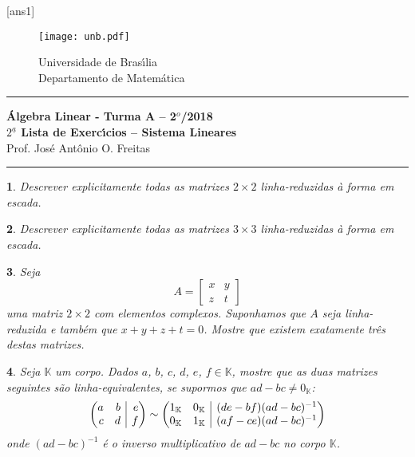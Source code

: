 \documentclass[12pt]{exam}
\makeatletter
\newenvironment{amatrix}[1]{%
  \left(\begin{array}{@{}*{#1}{r}|r@{}}
}{%
  \end{array}\right)
}
\newtheorem{exercicio}{}
\newcommand{\cp}[1]{\mathbb{#1}}
\newcommand{\vesp}[1]{\vspace{ #1  cm}}
\makeatother
\begin{document}
\pagestyle{empty}

[ans1]

\begin{figure}[h]
        \begin{minipage}[c]{1.7cm}
        \texttt{[image: unb.pdf]}
        \end{minipage}%
        \hspace{0pt}
        \begin{minipage}[c]{4in}
          {Universidade de Bras{\'\i}lia} \\
          {Departamento de Matem{\'a}tica}
\end{minipage}
\end{figure}

\vesp{-0.35} \hrule

\begin{center}
{\Large\bf \'Algebra Linear - Turma A -- 2$^{o}$/2018} \\ \vspace{9pt} {\large\bf
  $2^{\underline{a}}$ Lista de Exerc{\'\i}cios -- Sistema Lineares}\\ \vspace{9pt} Prof. Jos{\'e} Ant{\^o}nio O. Freitas
\end{center}
\hrule

\vesp{.6}
\begin{exercicio}
  Descrever explicitamente todas as matrizes $2 \times 2$ linha-reduzidas \`a forma em escada.
\end{exercicio}

\begin{exercicio}
  Descrever explicitamente todas as matrizes $3 \times 3$ linha-reduzidas \`a forma em escada.
\end{exercicio}

\begin{exercicio}
  Seja
  \[
    A = \begin{bmatrix}
      x & y\\
      z & t
    \end{bmatrix}
  \]
  uma matriz $2 \times 2$ com elementos complexos. Suponhamos que $A$ seja linha-reduzida e tamb\'em que $x + y + z + t = 0$. Mostre que existem exatamente tr\^es destas matrizes.
\end{exercicio}

\begin{exercicio}
  Seja $\cp{K}$ um corpo. Dados $a$, $b$, $c$, $d$, $e$, $f \in \cp{K}$, mostre que as duas matrizes seguintes são linha-equivalentes, se supormos que $ad - bc \ne 0_{\cp{K}}$:
  \[
    \begin{amatrix}{2}
      a & b & e\\
      c & d & f
    \end{amatrix} \sim \begin{amatrix}{2}
      1_{\cp{K}} & 0_{\cp{K}} & (de - bf)(ad - bc)^{-1}\\
      0_{\cp{K}} & 1_{\cp{K}} & (af - ce)(ad - bc)^{-1}
    \end{amatrix}
  \]
  onde $(ad - bc)^{-1}$ é o inverso multiplicativo de $ad - bc$ no corpo $\cp{K}$.
\end{exercicio}
\end{document}
